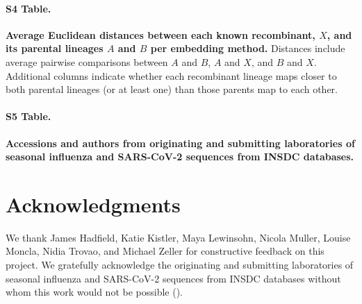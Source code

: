 \documentclass[10pt,letterpaper]{article}
\begin{document}
\paragraph*{S4 Table.}
\label{S_Table_recombinant_distances}
{\bf Average Euclidean distances between each known recombinant, $X$, and its parental lineages $A$ and $B$ per embedding method.}
Distances include average pairwise comparisons between $A$ and $B$, $A$ and $X$, and $B$ and $X$.
Additional columns indicate whether each recombinant lineage maps closer to both parental lineages (or at least one) than those parents map to each other.

\paragraph*{S5 Table.}
\label{S_Table_accessions}
{\bf Accessions and authors from originating and submitting laboratories of seasonal influenza and SARS-CoV-2 sequences from INSDC databases.}

\section*{Acknowledgments}

We thank James Hadfield, Katie Kistler, Maya Lewinsohn, Nicola Muller, Louise Moncla, Nidia Trovao, and Michael Zeller for constructive feedback on this project.
We gratefully acknowledge the originating and submitting laboratories of seasonal influenza and SARS-CoV-2 sequences from INSDC databases without whom this work would not be possible ().

\nolinenumbers

%
%
%







\end{document}
